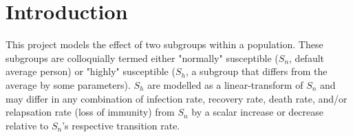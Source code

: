 \section{Introduction}

This project models the effect of two subgroups within a population. These subgroups are colloquially termed either "normally" susceptible ($S_n$, default average person) or "highly" susceptible ($S_h$, a subgroup that differs from the average by some parameters). $S_h$ are modelled as a linear-transform of $S_n$ and may differ in any combination of infection rate, recovery rate, death rate, and/or relapsation rate (loss of immunity) from $S_n$ by a scalar increase or decrease relative to $S_n$'s respective transition rate.




